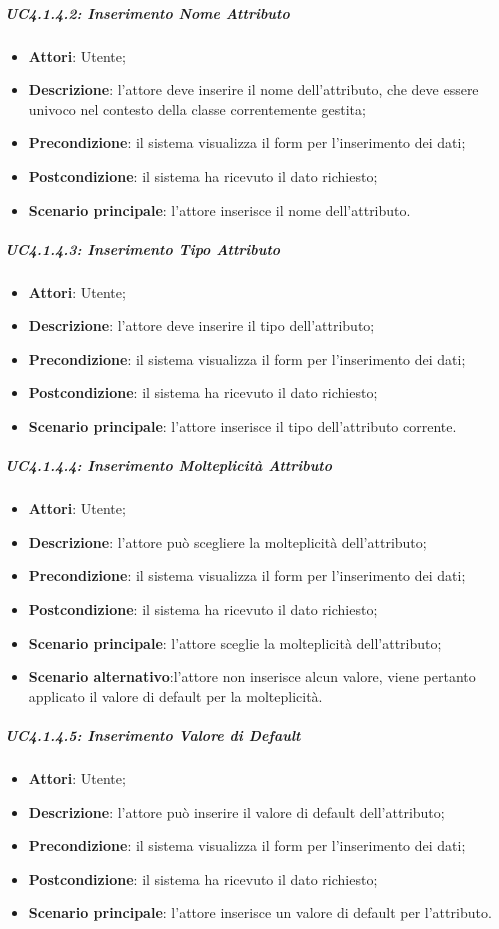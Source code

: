 \subparagraph{UC4.1.4.2: Inserimento Nome Attributo}
\label{UC4.1.4.2}
\begin{itemize}
\item \textbf{Attori}: Utente;
\item \textbf{Descrizione}: l'attore deve inserire il nome dell'attributo, che deve essere univoco nel contesto della classe correntemente gestita;
\item \textbf{Precondizione}: il sistema visualizza il form per l'inserimento dei dati;
\item \textbf{Postcondizione}: il sistema ha ricevuto il dato richiesto;
\item \textbf{Scenario principale}:
l'attore inserisce il nome dell'attributo.
\end{itemize}

\subparagraph{UC4.1.4.3: Inserimento Tipo Attributo}
\label{UC4.1.4.3}
\begin{itemize}
\item \textbf{Attori}: Utente;
\item \textbf{Descrizione}: l'attore deve inserire il tipo dell'attributo;
\item \textbf{Precondizione}: il sistema visualizza il form per l'inserimento dei dati;
\item \textbf{Postcondizione}: il sistema ha ricevuto il dato richiesto;
\item \textbf{Scenario principale}:
l'attore inserisce il tipo dell'attributo corrente.
\end{itemize}

\subparagraph{UC4.1.4.4: Inserimento Molteplicità Attributo}
\label{UC4.1.4.4}
\begin{itemize}
\item \textbf{Attori}: Utente;
\item \textbf{Descrizione}: l'attore può scegliere la molteplicità dell'attributo;
\item \textbf{Precondizione}: il sistema visualizza il form per l'inserimento dei dati;
\item \textbf{Postcondizione}: il sistema ha ricevuto il dato richiesto;
\item \textbf{Scenario principale}:
l'attore sceglie la molteplicità dell'attributo;
\item \textbf{Scenario alternativo}:l'attore non inserisce alcun valore, viene pertanto applicato il valore di default per la molteplicità. 
\end{itemize}

\subparagraph{UC4.1.4.5: Inserimento Valore di Default}
\label{UC4.1.4.5}
\begin{itemize}
\item \textbf{Attori}: Utente;
\item \textbf{Descrizione}: l'attore può inserire il valore di default dell'attributo;
\item \textbf{Precondizione}: il sistema visualizza il form per l'inserimento dei dati;
\item \textbf{Postcondizione}: il sistema ha ricevuto il dato richiesto;
\item \textbf{Scenario principale}:
l'attore inserisce un valore di default per l'attributo.
\end{itemize}


